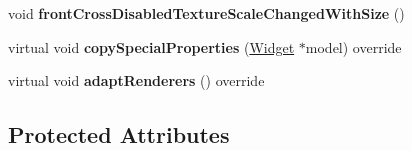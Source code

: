 \begin{DoxyCompactItemize}
void {\bfseries front\+Cross\+Disabled\+Texture\+Scale\+Changed\+With\+Size} ()
\item 
\mbox{\label{classui_1_1AbstractCheckButton_a238f09f268e449c8b346b6738b58a9db}} 
virtual void {\bfseries copy\+Special\+Properties} (\hyperlink{classui_1_1Widget}{Widget} $\ast$model) override
\item 
\mbox{\label{classui_1_1AbstractCheckButton_ab95af7798405dd9c77499154a298f8ac}} 
virtual void {\bfseries adapt\+Renderers} () override
\end{DoxyCompactItemize}
\subsection*{Protected Attributes}
